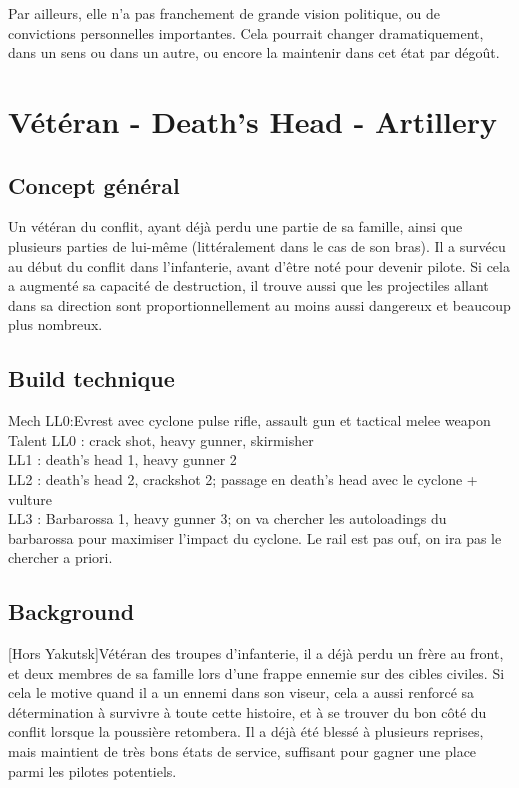 \documentclass[10pt,a4paper]{article}
\begin{document}
Par ailleurs, elle n'a pas franchement de grande vision politique, ou de convictions personnelles importantes. Cela pourrait changer dramatiquement, dans un sens ou dans un autre, ou encore la maintenir dans cet état par dégoût.
\section{Vétéran - Death's Head - Artillery}
\subsection{Concept général}
Un vétéran du conflit, ayant déjà perdu une partie de sa famille, ainsi que plusieurs parties de lui-même (littéralement dans le cas de son bras). Il a survécu au début du conflit dans l'infanterie, avant d'être noté pour devenir pilote. Si cela a augmenté sa capacité de destruction, il trouve aussi que les projectiles allant dans sa direction sont proportionnellement au moins aussi dangereux et beaucoup plus nombreux.
\subsection{Build technique}
Mech LL0:Evrest avec cyclone pulse rifle, assault gun et tactical melee weapon \\
Talent LL0 : crack shot, heavy gunner, skirmisher \\
LL1 : death's head 1, heavy gunner 2\\
LL2 : death's head 2, crackshot 2; passage en death's head avec le cyclone + vulture\\
LL3 : Barbarossa 1, heavy gunner 3; on va chercher les autoloadings du barbarossa pour maximiser l'impact du cyclone. Le rail est pas ouf, on ira pas le chercher a priori.\\
\subsection{Background}
[Hors Yakutsk]Vétéran des troupes d'infanterie, il a déjà perdu un frère au front, et deux membres de sa famille lors d'une frappe ennemie sur des cibles civiles. Si cela le motive quand il a un ennemi dans son viseur, cela a aussi renforcé sa détermination à survivre à toute cette histoire, et à se trouver du bon côté du conflit lorsque la poussière retombera. Il a déjà été blessé à plusieurs reprises, mais maintient de très bons états de service, suffisant pour gagner une place parmi les pilotes potentiels.
\end{document}
